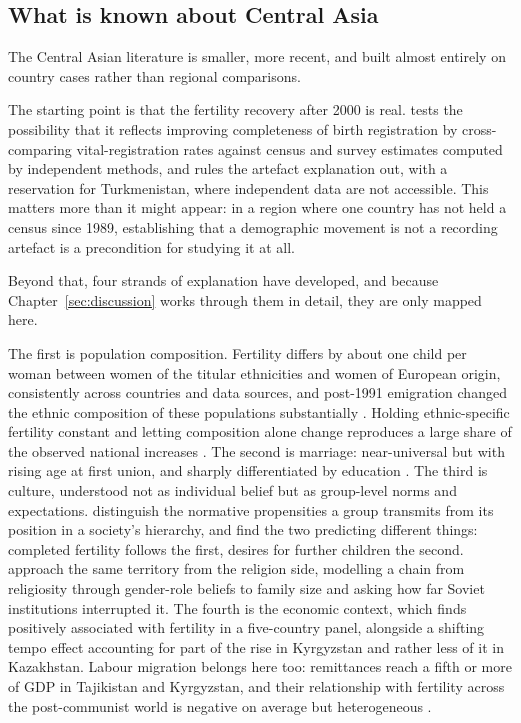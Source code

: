 \subsection{What is known about Central Asia}
\label{sec:ca-literature}

The Central Asian literature is smaller, more recent, and built almost entirely on country cases rather than regional comparisons.

The starting point is that the fertility recovery after 2000 is real. \textcite{spoorenberg2015} tests the possibility that it reflects improving completeness of birth registration by cross-comparing vital-registration rates against census and survey estimates computed by independent methods, and rules the artefact explanation out, with a reservation for Turkmenistan, where independent data are not accessible. This matters more than it might appear: in a region where one country has not held a census since 1989, establishing that a demographic movement is not a recording artefact is a precondition for studying it at all.

Beyond that, four strands of explanation have developed, and because Chapter~\ref{sec:discussion} works through them in detail, they are only mapped here.

The first is population composition. Fertility differs by about one child per woman between women of the titular ethnicities and women of European origin, consistently across countries and data sources, and post-1991 emigration changed the ethnic composition of these populations substantially \parencite{spoorenberg2013,agadjanian2013}. Holding ethnic-specific fertility constant and letting composition alone change reproduces a large share of the observed national increases \parencite{spoorenberg2015}. The second is marriage: near-universal but with rising age at first union, and sharply differentiated by education \parencite{dommaraju2008}. The third is culture, understood not as individual belief but as group-level norms and expectations. \textcite{agadjanian2022} distinguish the normative propensities a group transmits from its position in a society's hierarchy, and find the two predicting different things: completed fertility follows the first, desires for further children the second. \textcite{kumo2024} approach the same territory from the religion side, modelling a chain from religiosity through gender-role beliefs to family size and asking how far Soviet institutions interrupted it. The fourth is the economic context, which \textcite{spoorenberg2015} finds positively associated with fertility in a five-country panel, alongside a shifting tempo effect accounting for part of the rise in Kyrgyzstan and rather less of it in Kazakhstan. Labour migration belongs here too: remittances reach a fifth or more of GDP in Tajikistan and Kyrgyzstan, and their relationship with fertility across the post-communist world is negative on average but heterogeneous \parencite{tokhirov2024}.

